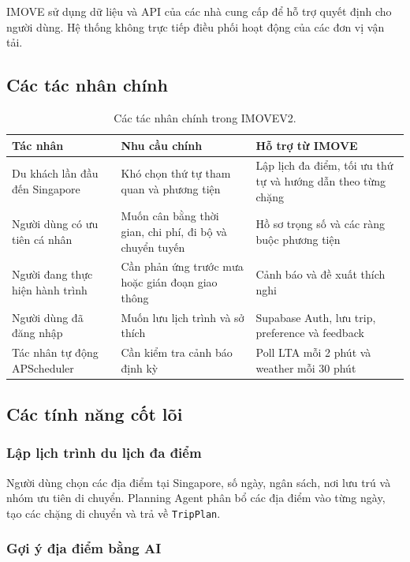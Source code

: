 \documentclass[12pt,a4paper]{article}
\begin{document}
IMOVE sử dụng dữ liệu và API của các nhà cung cấp để hỗ trợ quyết định cho người dùng. Hệ thống không trực tiếp điều phối hoạt động của các đơn vị vận tải.

\subsection{Các tác nhân chính}


\begin{table}[H]
\centering
\begin{tabularx}{\textwidth}{|L{3.4cm}|X|X|}
\hline
\textbf{Tác nhân} & \textbf{Nhu cầu chính} & \textbf{Hỗ trợ từ IMOVE} \\ \hline
Du khách lần đầu đến Singapore & Khó chọn thứ tự tham quan và phương tiện & Lập lịch đa điểm, tối ưu thứ tự và hướng dẫn theo từng chặng \\ \hline
Người dùng có ưu tiên cá nhân & Muốn cân bằng thời gian, chi phí, đi bộ và chuyển tuyến & Hồ sơ trọng số và các ràng buộc phương tiện \\ \hline
Người đang thực hiện hành trình & Cần phản ứng trước mưa hoặc gián đoạn giao thông & Cảnh báo và đề xuất thích nghi \\ \hline
Người dùng đã đăng nhập & Muốn lưu lịch trình và sở thích & Supabase Auth, lưu trip, preference và feedback \\ \hline
Tác nhân tự động APScheduler & Cần kiểm tra cảnh báo định kỳ & Poll LTA mỗi 2 phút và weather mỗi 30 phút \\ \hline
\end{tabularx}
\caption{Các tác nhân chính trong IMOVEV2.}
\label{tab:main-actors}
\end{table}

\subsection{Các tính năng cốt lõi}


\subsubsection{Lập lịch trình du lịch đa điểm}

Người dùng chọn các địa điểm tại Singapore, số ngày, ngân sách, nơi lưu trú và nhóm ưu tiên di chuyển. Planning Agent phân bổ các địa điểm vào từng ngày, tạo các chặng di chuyển và trả về \texttt{TripPlan}.

\subsubsection{Gợi ý địa điểm bằng AI}
\end{document}
